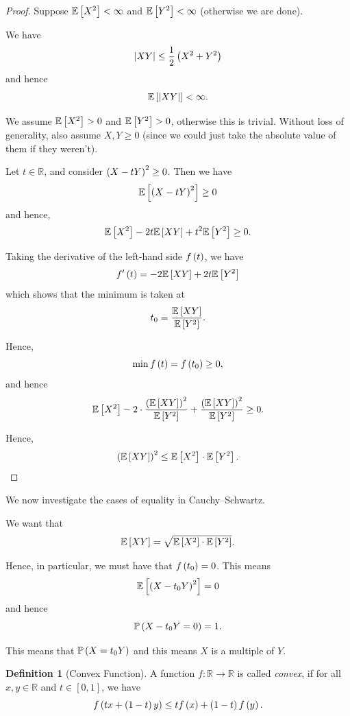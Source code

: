 \documentclass{article}
\theoremstyle{definition}
\newtheorem{definition}[theorem]{Definition}
\theoremstyle{remark}
\DeclarePairedDelimiter{\abs}{\lvert}{\rvert}
\newcommand{\RR}{\mathbb{R}}
\newcommand{\Prob}{\mathbb{P}}
\newcommand{\Expt}{\mathbb{E}}
\newcommand{\ccintv}[2]{[#1,#2]}
\newcommand{\functiondomain}[3]{#1:#2\to #3}
\begin{document}
\begin{proof}
    Suppose \(\Expt\bqty{X^2} < \infty\) and \(\Expt\bqty{Y^2} < \infty\) (otherwise we are done).

    We have
    \[
        \abs{XY} \leq \frac{1}{2} \pqty{X^2 + Y^2}
    \]
    and hence
    \[
        \Expt\bqty{\abs{XY}} < \infty.
    \]

    We assume \(\Expt\bqty{X^2} > 0\) and \(\Expt\bqty{Y^2} > 0\), otherwise this is trivial. Without loss of generality, also assume \(X, Y \geq 0\) (since we could just take the absolute value of them if they weren't).

    Let \(t \in \RR\), and consider \(\left(X - tY\right)^2 \geq 0\). Then we have
    \[
        \Expt\bqty{\pqty{X - tY}^2} \geq 0
    \]
    and hence,
    \[
        \Expt\bqty{X^2} - 2t \Expt\bqty{XY} + t^2 \Expt\bqty{Y^2} \geq 0.
    \]

    Taking the derivative of the left-hand side \(f\left(t\right)\), we have
    \[
        f'\pqty{t} = -2 \Expt\bqty{XY} + 2t \Expt\bqty{Y^2}
    \]
    which shows that the minimum is taken at
    \[
        t_0 = \frac{\Expt\bqty{XY}}{\Expt\bqty{Y^2}}.
    \]

    Hence,
    \[
        \min f\left(t\right) = f\left(t_0\right) \geq 0,
    \]
    and hence
    \[
        \Expt\bqty{X^2} - 2 \cdot \frac{\pqty{\Expt\bqty{XY}}^2}{\Expt\bqty{Y^2}} + \frac{\pqty{\Expt\bqty{XY}}^2}{\Expt\bqty{Y^2}} \geq 0.
    \]

    Hence,
    \[
        \pqty{\Expt\bqty{XY}}^2 \leq \Expt\bqty{X^2} \cdot \Expt\bqty{Y^2}.
    \]
\end{proof}

We now investigate the cases of equality in Cauchy--Schwartz.

We want that
\[
    \Expt\bqty{XY} = \sqrt{\Expt\bqty{X^2} \cdot \Expt\bqty{Y^2}}.
\]

Hence, in particular, we must have that \(f\left(t_0\right) = 0\). This means
\[
    \Expt\bqty{\pqty{X - t_0 Y}^2} = 0
\]
and hence
\[
    \Prob\pqty{X - t_0 Y = 0} = 1.
\]

This means that \(\Prob\pqty{X = t_0 Y}\) and this means \(X\) is a multiple of \(Y\).

\begin{definition}[Convex Function]
    \label{def:convex-fn}%
    A function \(\functiondomain{f}{\RR}{\RR}\) is called \emph{convex}, if for all \(x, y \in \RR\) and \(t \in \ccintv{0}{1}\), we have
    \[
        f\left(tx + \left(1 - t\right) y\right) \leq t f\left(x\right) + \left(1 - t\right) f\left(y\right).
    \]
\end{definition}
\end{document}
